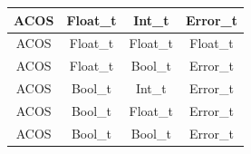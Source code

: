 \begin{figure}[H]
\begin{tabular}{cccc}
        \midrule ACOS & Float\_t & Int\_t    & Error\_t \\
        \midrule ACOS & Float\_t & Float\_t  & Float\_t \\
        \midrule ACOS & Float\_t & Bool\_t   & Error\_t \\

        \midrule ACOS & Bool\_t & Int\_t     & Error\_t \\
        \midrule ACOS & Bool\_t & Float\_t   & Error\_t \\
        \midrule ACOS & Bool\_t & Bool\_t    & Error\_t \\

        \bottomrule
    \end{tabular}\\
\end{figure}

\newpage

